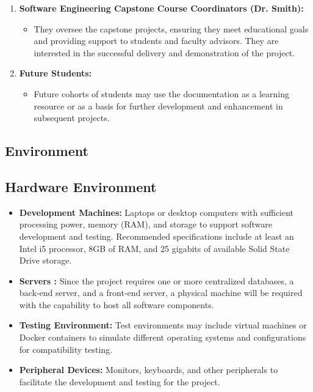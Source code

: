 \documentclass{article}
\begin{document}
\begin{enumerate}
    \item \textbf{Software Engineering Capstone Course Coordinators (Dr. Smith):}
    \begin{itemize}
        \item They oversee the capstone projects, ensuring they meet educational goals and providing support to students and faculty advisors. They are interested in the successful delivery and demonstration of the project.
    \end{itemize}

    \item \textbf{Future Students:}
    \begin{itemize}
        \item Future cohorts of students may use the documentation as a learning resource or as a basis for further development and enhancement in subsequent projects.
    \end{itemize}

\end{enumerate}

\subsection{Environment}

\subsection*{Hardware Environment}
\begin{itemize}
    \item \textbf{Development Machines:} Laptops or desktop computers with sufficient processing power, memory (RAM), and storage to support software development and testing. Recommended specifications include at least an Intel i5 processor, 8GB of RAM, and 25 gigabits of available Solid State Drive storage.
    \item \textbf{Servers :} Since the project requires one or more centralized databases, a back-end server, and a front-end server, a physical machine will be required with the capability to host all software components.
    \item \textbf{Testing Environment:} Test environments may include virtual machines or Docker containers to simulate different operating systems and configurations for compatibility testing.
    \item \textbf{Peripheral Devices:} Monitors, keyboards, and other peripherals to facilitate the development and testing for the project.
\end{itemize}
\end{document}

